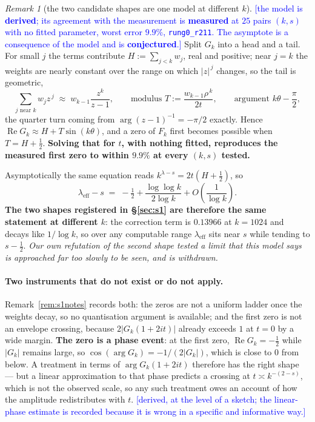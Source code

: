 \documentclass[11pt,a4paper]{article}
\theoremstyle{plain}
\theoremstyle{definition}
\theoremstyle{remark}
\newtheorem{remark}[theorem]{Remark}
\newcommand{\STATUS}[1]{\textcolor{blue}{\textsf{[#1]}}}
\begin{document}
\begin{remark}[the two candidate shapes are one model at different $k$]\label{rem:oneshape}
\STATUS{the model is \textbf{derived}; its agreement with the measurement is
\textbf{measured} at $25$ pairs $(k,s)$ with no fitted parameter, worst error $9.9\%$,
\texttt{rung0\_r211}. The asymptote is a consequence of the model and is
\textbf{conjectured}.}
Split $G_k$ into a head and a tail. For small $j$ the terms contribute
$H:=\sum_{j<k}w_j$, real and positive; near $j=k$ the weights are nearly constant over
the range on which $|z|^{\,j}$ changes, so the tail is geometric,
\[
  \sum_{j\text{ near }k}w_jz^{\,j}\;\approx\;w_{k-1}\frac{z^{k}}{z-1},
  \qquad\text{modulus } T:=\frac{w_{k-1}\rho^{\,k}}{2t},
  \qquad\text{argument } k\theta-\frac{\pi}{2},
\]
the quarter turn coming from $\arg(z-1)^{-1}=-\pi/2$ exactly. Hence
$\operatorname{Re}G_k\approx H+T\sin(k\theta)$, and a zero of $F_k$ first becomes
possible when $T=H+\tfrac12$. \textbf{Solving that for $t$, with nothing fitted,
reproduces the measured first zero to within $9.9\%$ at every $(k,s)$ tested.}

Asymptotically the same equation reads $k^{\lambda-s}=2t(H+\tfrac12)$, so
\[
  \lambda_{\mathrm{eff}}-s\;=\;-\tfrac12+\frac{\log\log k}{2\log k}+O\!\left(\frac{1}{\log k}\right).
\]
\textbf{The two shapes registered in \S\ref{sec:s1} are therefore the same statement at
different $k$}: the correction term is $0.13966$ at $k=1024$ and decays like $1/\log k$,
so over any computable range $\lambda_{\mathrm{eff}}$ sits near $s$ while tending to
$s-\tfrac12$. \emph{Our own refutation of the second shape tested a limit that this model
says is approached far too slowly to be seen, and is withdrawn.}
\end{remark}

\paragraph{Two instruments that do not exist or do not apply.}
Remark~\ref{rem:s1notes} records both: the zeros are not a uniform ladder once the
weights decay, so no quantisation argument is available; and the first zero is not an
envelope crossing, because $2|G_k(1+2it)|$ already exceeds $1$ at $t=0$ by a wide margin.
\textbf{The zero is a phase event}: at the first zero, $\operatorname{Re}G_k=-\tfrac12$
while $|G_k|$ remains large, so $\cos(\arg G_k)=-1/(2|G_k|)$, which is close to $0$ from
below. A treatment in terms of $\arg G_k(1+2it)$ therefore has the right shape --- but a
linear approximation to that phase predicts a crossing at $t\asymp k^{-(2-s)}$, which is
not the observed scale, so any such treatment owes an account of how the amplitude
redistributes with $t$.
\STATUS{derived, at the level of a sketch; the linear-phase estimate is recorded because
it is wrong in a specific and informative way.}
\end{document}
